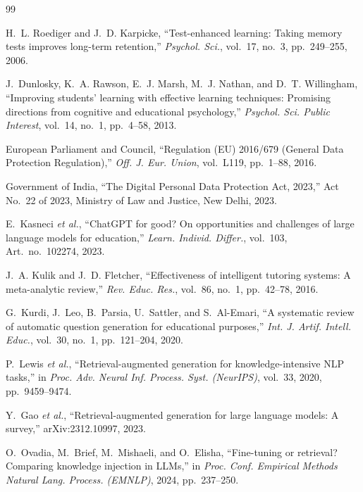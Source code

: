\documentclass[conference]{IEEEtran}
\begin{document}
\begin{thebibliography}{99}
\footnotesize

H.~L. Roediger and J.~D. Karpicke, ``Test-enhanced learning: Taking memory
tests improves long-term retention,'' \textit{Psychol. Sci.}, vol.~17, no.~3,
pp.~249--255, 2006.

J.~Dunlosky, K.~A. Rawson, E.~J. Marsh, M.~J. Nathan, and D.~T. Willingham,
``Improving students' learning with effective learning techniques: Promising
directions from cognitive and educational psychology,'' \textit{Psychol. Sci.
Public Interest}, vol.~14, no.~1, pp.~4--58, 2013.

European Parliament and Council, ``Regulation (EU) 2016/679 (General Data
Protection Regulation),'' \textit{Off. J. Eur. Union}, vol.~L119, pp.~1--88,
2016.

Government of India, ``The Digital Personal Data Protection Act, 2023,'' Act
No.~22 of 2023, Ministry of Law and Justice, New Delhi, 2023.

E.~Kasneci \textit{et al.}, ``ChatGPT for good? On opportunities and
challenges of large language models for education,'' \textit{Learn. Individ.
Differ.}, vol.~103, Art.~no.~102274, 2023.

J.~A. Kulik and J.~D. Fletcher, ``Effectiveness of intelligent tutoring
systems: A meta-analytic review,'' \textit{Rev. Educ. Res.}, vol.~86, no.~1,
pp.~42--78, 2016.

G.~Kurdi, J.~Leo, B.~Parsia, U.~Sattler, and S.~Al-Emari, ``A systematic
review of automatic question generation for educational purposes,''
\textit{Int. J. Artif. Intell. Educ.}, vol.~30, no.~1, pp.~121--204, 2020.

P.~Lewis \textit{et al.}, ``Retrieval-augmented generation for
knowledge-intensive NLP tasks,'' in \textit{Proc. Adv. Neural Inf. Process.
Syst. (NeurIPS)}, vol.~33, 2020, pp.~9459--9474.

Y.~Gao \textit{et al.}, ``Retrieval-augmented generation for large language
models: A survey,'' arXiv:2312.10997, 2023.

O.~Ovadia, M.~Brief, M.~Mishaeli, and O.~Elisha, ``Fine-tuning or retrieval?
Comparing knowledge injection in LLMs,'' in \textit{Proc. Conf. Empirical
Methods Natural Lang. Process. (EMNLP)}, 2024, pp.~237--250.


\end{thebibliography}
\end{document}
